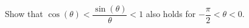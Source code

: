 {Show that $\cos(\theta) < \dfrac{\sin(\theta)}{\theta} < 1$ also holds for $-\dfrac{\pi}{2}< \theta < 0$.}
{}
